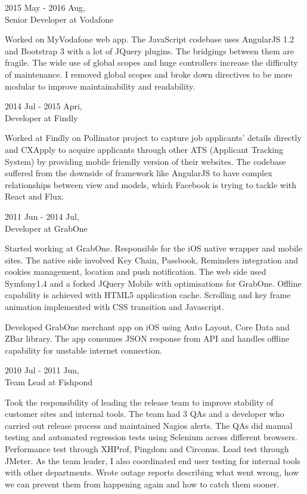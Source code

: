 \begin{resume}
\hspace*{-0.25in} 2015 May - 2016 Aug,\\
\hspace*{-0.25in} Senior Developer at Vodafone

Worked on MyVodafone web app. The JavaScript codebase uses AngularJS 1.2 and Bootstrap 3 with a lot of JQuery plugins. The bridgings between them are fragile. The wide use of global scopes and huge controllers increase the difficulty of maintenance. I removed global scopes and broke down directives to be more modular to improve maintainability and readability. 

\hspace*{-0.25in} 2014 Jul - 2015 Apri,\\
\hspace*{-0.25in} Developer at Findly

Worked at Findly on Pollinator project to capture job applicants' details directly and CXApply to acquire applicants through other ATS (Applicant Tracking System) by providing mobile friendly version of their websites. The codebase suffered from the downside of framework like AngularJS to have complex relationships between view and models, which Facebook is trying to tackle with React and Flux.

\hspace*{-0.25in} 2011 Jun - 2014 Jul,\\
\hspace*{-0.25in} Developer at GrabOne

Started working at GrabOne. Responsible for the iOS native wrapper and mobile sites. The native side involved Key Chain, Passbook, Reminders integration and cookies management, location and push notification. The web side used Symfony1.4 and a forked JQuery Mobile with optimisations for GrabOne. Offline capability is achieved with HTML5 application cache. Scrolling and key frame animation implemented with CSS transition and Javascript. 

Developed GrabOne merchant app on iOS using Auto Layout, Core Data and ZBar library. The app consumes JSON response from API and handles offline capability for unstable internet connection.

\hspace*{-0.25in} 2010 Jul - 2011 Jun,\\
\hspace*{-0.25in} Team Lead at Fishpond

Took the responsibility of leading the release team to improve stability of customer sites and internal tools. The team had 3 QAs and a developer who carried out release process and maintained Nagios alerts. The QAs did manual testing and automated regression tests using Selenium across different browsers. Performance test through XHProf, Pingdom and Circonus. Load test through JMeter. As the team leader, I also coordinated end user testing for internal tools with other departments. Wrote outage reports describing what went wrong, how we can prevent them from happening again and how to catch them sooner.


\end{resume}
